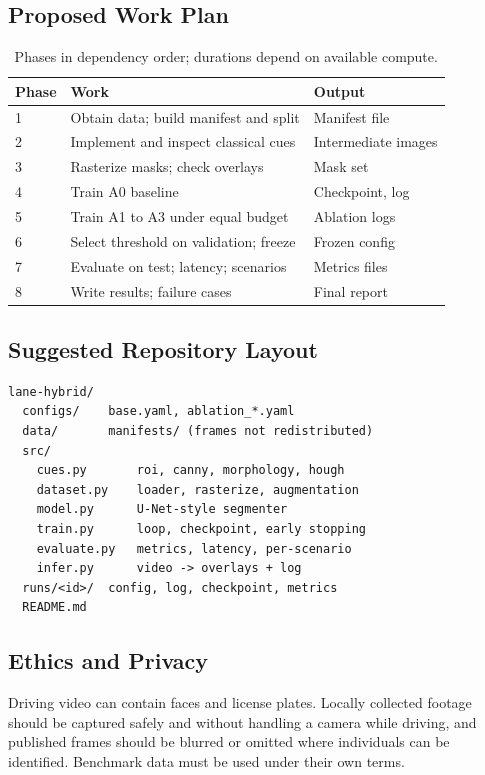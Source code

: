 \documentclass[10pt,a4paper,twocolumn]{article}
\begin{document}
\subsection{Proposed Work Plan}
\begin{table}[H]
\centering
\caption{Phases in dependency order; durations depend on available compute.}
\footnotesize
\begin{tabularx}{\columnwidth}{|l|X|l|}
\hline
\rowcolor{gray!18}\textbf{Phase}&\textbf{Work}&\textbf{Output}\\ \hline
1 & Obtain data; build manifest and split & Manifest file\\ \hline
2 & Implement and inspect classical cues & Intermediate images\\ \hline
3 & Rasterize masks; check overlays & Mask set\\ \hline
4 & Train A0 baseline & Checkpoint, log\\ \hline
5 & Train A1 to A3 under equal budget & Ablation logs\\ \hline
6 & Select threshold on validation; freeze & Frozen config\\ \hline
7 & Evaluate on test; latency; scenarios & Metrics files\\ \hline
8 & Write results; failure cases & Final report\\ \hline
\end{tabularx}
\end{table}

\subsection{Suggested Repository Layout}
\begin{lstlisting}
lane-hybrid/
  configs/    base.yaml, ablation_*.yaml
  data/       manifests/ (frames not redistributed)
  src/
    cues.py       roi, canny, morphology, hough
    dataset.py    loader, rasterize, augmentation
    model.py      U-Net-style segmenter
    train.py      loop, checkpoint, early stopping
    evaluate.py   metrics, latency, per-scenario
    infer.py      video -> overlays + log
  runs/<id>/  config, log, checkpoint, metrics
  README.md
\end{lstlisting}

\subsection{Ethics and Privacy}
Driving video can contain faces and license plates. Locally collected footage should be captured safely and without handling a camera while driving, and published frames should be blurred or omitted where individuals can be identified. Benchmark data must be used under their own terms.
\end{document}

